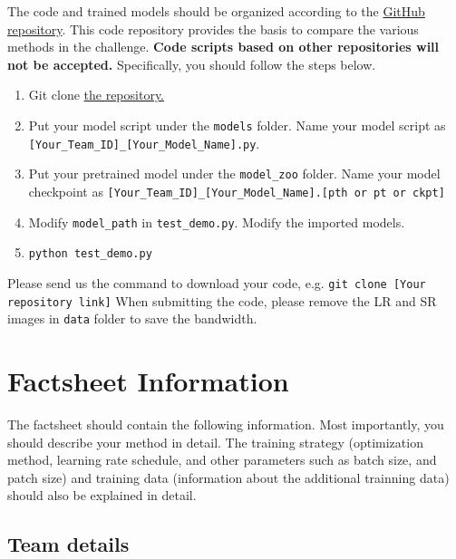 \documentclass[10pt,twocolumn,letterpaper]{article}
\begin{document}
The code and trained models should be organized according to the \href{https://github.com/ofsoundof/NTIRE2023_ESR}{GitHub repository}. This code repository provides the basis to compare the various methods in the challenge. \textbf{Code scripts based on other repositories will not be accepted.} Specifically, you should follow the steps below.
\begin{enumerate}
    \item Git clone \href{https://github.com/ofsoundof/NTIRE2023_ESR}{the repository.}
    \item Put your model script under the \texttt{models} folder. Name your model script as \texttt{[Your\_Team\_ID]\_[Your\_Model\_Name].py}.
    \item Put your pretrained model under the \texttt{model\_zoo} folder. Name your model checkpoint as \texttt{[Your\_Team\_ID]\_[Your\_Model\_Name].[pth or pt or ckpt]}
    \item Modify \texttt{model\_path} in \texttt{test\_demo.py}. Modify the imported models.
    \item \texttt{python test\_demo.py}
\end{enumerate}
Please send us the command to download your code, e.g. \texttt{git clone [Your repository link]}
When submitting the code, please remove the LR and SR images in \texttt{data} folder to save the bandwidth.

\section{Factsheet Information}

The factsheet should contain the following information. Most importantly, you should describe your method in detail. The training strategy (optimization method, learning rate schedule, and other parameters such as batch size, and patch size) and training data (information about the additional trainning data) should also be explained in detail.

\subsection{Team details}
\end{document}
